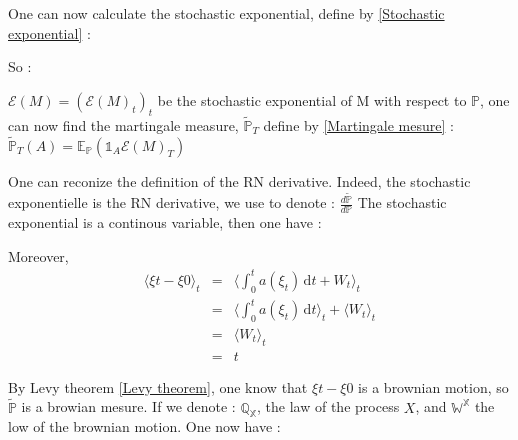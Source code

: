 One can now calculate the stochastic exponential, define by \ref{Stochastic exponential} :
\newline


So :


$\mathcal{E}(M)=(\mathcal{E}(M)_{t})_{t}$ be the stochastic exponential of M with respect to $\mathbb{P}$, one can now find the martingale measure, $\tilde{\mathbb{P}}_{T}$ define by \ref{Martingale mesure} :
\newline
$\tilde{\mathbb{P}}_{T}(A)=\mathbb{E}_{\mathbb{P}}(\mathds{1}_{A}\mathcal{E}(M)_{T})$
\newline

One can reconize the definition of the RN derivative.
Indeed, the stochastic exponentielle is the RN derivative, we use to denote : $\frac{d \tilde{\mathbb{P}}}{d\mathbb{P}}$
\newline
The stochastic exponential is a continous variable, then one have :
\newline

Moreover,
\newline
\begin{eqnarray*}
\langle \xi{t}-\xi{0}\rangle_{t}&=&\langle \int_0^t a(\xi_{t}) \, \mathrm dt + W_t\rangle_{t} \\
&=&\langle \int_0^t a(\xi_{t}) \, \mathrm dt \rangle_{t}+\langle  W_t\rangle_{t} \\
&=&\langle  W_t\rangle_{t} \\
&=&t
\end{eqnarray*}

By Levy theorem \ref{Levy theorem}, one know that $\xi{t}-\xi{0}$ is a brownian motion, so $\tilde{\mathbb{P}}$ is a browian mesure.
\newline
If we denote : $\mathbb{Q_{X}}$, the law of the process $X$, and $\mathbb{W^{X}}$ the low of the brownian motion. One now have :
\newline